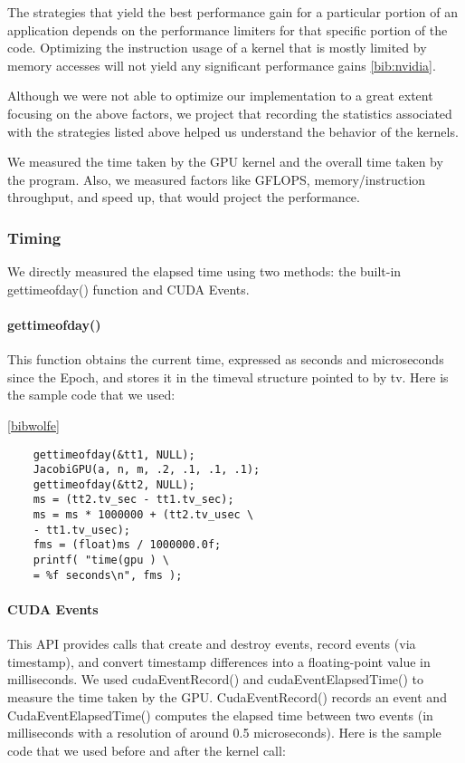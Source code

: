 \documentclass[10pt]{article}
\begin{document}
\begin{multicols}{2}
  The strategies that yield the best performance gain for a particular portion of an application depends on the performance limiters for that specific portion of the code.
  Optimizing the instruction usage of a kernel that is mostly limited by memory accesses will not yield any significant performance gains \ref{bib:nvidia}.

  Although we were not able to optimize our implementation to a great extent focusing on the above factors, we project that recording the statistics associated with the strategies listed above helped us understand the behavior of the kernels.

  We measured the time taken by the GPU kernel and the overall time taken by the program.
  Also, we measured factors like GFLOPS, memory/instruction throughput, and speed up, that would project the performance. 

  \subsubsection{Timing}

  We directly measured the elapsed time using two methods: the built-in gettimeofday() function and CUDA Events.

  \paragraph{gettimeofday()}
  This function obtains the current time, expressed as seconds and microseconds since the Epoch, and stores it in the timeval structure pointed to by tv.
  Here is the sample code that we used:

  \ref{bibwolfe}
  \begin{verbatim}
    gettimeofday(&tt1, NULL);
    JacobiGPU(a, n, m, .2, .1, .1, .1);
    gettimeofday(&tt2, NULL);
    ms = (tt2.tv_sec - tt1.tv_sec);
    ms = ms * 1000000 + (tt2.tv_usec \
    - tt1.tv_usec);
    fms = (float)ms / 1000000.0f;
    printf( "time(gpu ) \
    = %f seconds\n", fms );
  \end{verbatim}

  \paragraph{CUDA Events}
  This API provides calls that create and destroy events, record events (via timestamp), and convert timestamp differences into a floating-point value in milliseconds.
  We used cudaEventRecord() and cudaEventElapsedTime() to measure the time taken by the GPU.
  CudaEventRecord() records an event and CudaEventElapsedTime() computes the elapsed time between two events (in milliseconds with a resolution of around 0.5 microseconds).
  Here is the sample code that we used before and after the kernel call: 
  

\end{multicols}
\end{document}
